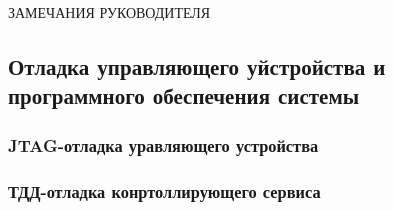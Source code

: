 \documentclass[russian,utf8,14pt,emptystyle,pointsubsection,reduceheight=0mm]{eskdtext}
\begin{document}
\pagestyle{plain}
\thispagestyle{empty}

\newpage{}

\begin{center}
\MakeUppercase{ЗАМЕЧАНИЯ РУКОВОДИТЕЛЯ}
\end{center}
\newpage{}


\newpage{}

\setcounter{page}{3}
\tableofcontents
\newpage{}

%














\subsection{Отладка управляющего уйстройства и программного обеспечения системы}
\subsubsection{JTAG-отладка уравляющего устройства}
\subsubsection{ТДД-отладка конртоллирующего сервиса}






\end{document}
